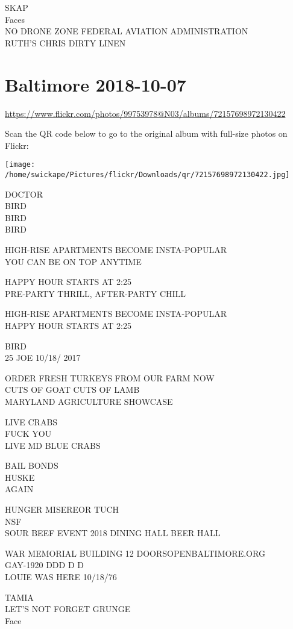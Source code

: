\documentclass[10pt,letterpaper]{article}
\begin{document}
SKAP\\
Faces\\
NO DRONE ZONE FEDERAL AVIATION ADMINISTRATION\\
RUTH'S CHRIS DIRTY LINEN


\section*{Baltimore 2018-10-07}

\url{https://www.flickr.com/photos/99753978@N03/albums/72157698972130422}

Scan the QR code below to go to the original album with full-size photos on Flickr:

\texttt{[image: /home/swickape/Pictures/flickr/Downloads/qr/72157698972130422.jpg]}


DOCTOR\\
BIRD\\
BIRD\\
BIRD

HIGH{-}RISE APARTMENTS BECOME INSTA{-}POPULAR\\
YOU CAN BE ON TOP ANYTIME

HAPPY HOUR STARTS AT 2:25\\
PRE{-}PARTY THRILL, AFTER{-}PARTY CHILL

HIGH{-}RISE APARTMENTS BECOME INSTA{-}POPULAR\\
HAPPY HOUR STARTS AT 2:25

BIRD\\
25 JOE 10/18/ 2017

ORDER FRESH TURKEYS FROM OUR FARM NOW\\
CUTS OF GOAT CUTS OF LAMB\\
MARYLAND AGRICULTURE SHOWCASE

LIVE CRABS\\
FUCK YOU\\
LIVE MD BLUE CRABS

BAIL BONDS\\
HUSKE\\
AGAIN

HUNGER MISEREOR TUCH\\
NSF\\
SOUR BEEF EVENT 2018 DINING HALL BEER HALL

WAR MEMORIAL BUILDING 12 DOORSOPENBALTIMORE.ORG\\
GAY{-}1920 DDD D D\\
LOUIE WAS HERE 10/18/76

TAMIA\\
LET'S NOT FORGET GRUNGE\\
Face
\end{document}

